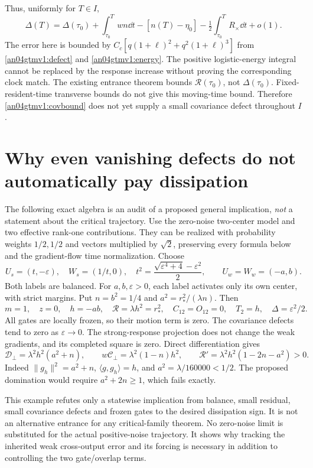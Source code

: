 \documentclass[11pt]{article}
\begin{document}
Thus, uniformly for $T\in I$,
\begin{equation}\label{an04gtmv1:clockdefect}
 \Delta(T)=\Delta(\tau_0)+\int_{\tau_0}^T wn\dd t
       -[n(T)-\eta_0]-\tfrac12\int_{\tau_0}^TR_\times\dd t+o(1).
\end{equation}
The error here is bounded by
$C_c[q(1+\ell)^2+q^2(1+\ell)^3]$ from
\eqref{an04gtmv1:defect} and \eqref{an04gtmv1:energy}.
The positive logistic-energy integral cannot be replaced by the
response increase without proving the corresponding clock match.
The existing entrance theorem bounds $\mathcal R(\tau_0)$, not
$\Delta(\tau_0)$. Fixed-resident-time transverse bounds do not
give this moving-time bound. Therefore \eqref{an04gtmv1:covbound}
does not yet supply a small covariance defect throughout $I$.

\section{Why even vanishing defects do not automatically pay dissipation}
The following exact algebra is an audit of a proposed general
implication, \emph{not} a statement about the critical trajectory.
Use the zero-noise two-center model and two effective rank-one
contributions. They can be realized with probability weights
$1/2,1/2$ and vectors multiplied by $\sqrt2$, preserving every
formula below and the gradient-flow time normalization.
Choose
\[
 U_s=(t,-\varepsilon),\quad W_s=(1/t,0),\quad
 t^2=\frac{\sqrt{\varepsilon^4+4}-\varepsilon^2}{2},\qquad
 U_w=W_w=(-a,b).
\]
Both labels are balanced. For $a,b,\varepsilon>0$, each label
activates only its own center, with strict margins. Put
$n=b^2=1/4$ and $a^2=r_*^2/(\lambda n)$.
Then
\[
 m=1,\quad z=0,\quad h=-ab,\quad
 \mathcal R=\lambda h^2=r_*^2,\quad
 C_{12}=O_{12}=0,\quad T_2=h,\quad \Delta=\varepsilon^2/2.
\]
All gates are locally frozen, so their motion term is zero.
The covariance defects tend to zero as $\varepsilon\to0$.
The strong-response projection does not change the weak gradients,
and its completed square is zero. Direct differentiation gives
\begin{equation}\label{an04gtmv1:audit}
 \mathcal D_\perp=\lambda^2h^2(a^2+n),\qquad
 w\mathcal C_\perp=\lambda^2(1-n)h^2,
 \qquad
 \mathcal R'=\lambda^2h^2(1-2n-a^2)>0.
\end{equation}
Indeed $\|g_h\|^2=a^2+n$, $\langle g,g_h\rangle=h$,
and $a^2=\lambda/160000<1/2$. The proposed domination would
require $a^2+2n\ge1$, which fails exactly.

This example refutes only a statewise implication from balance,
small residual, small covariance defects and frozen gates to the
desired dissipation sign. It is not an alternative entrance for
any critical-family theorem. No zero-noise limit is substituted
for the actual positive-noise trajectory. It shows why tracking
the inherited weak cross-output error and its forcing is necessary
in addition to controlling the two gate/overlap terms.
\end{document}
